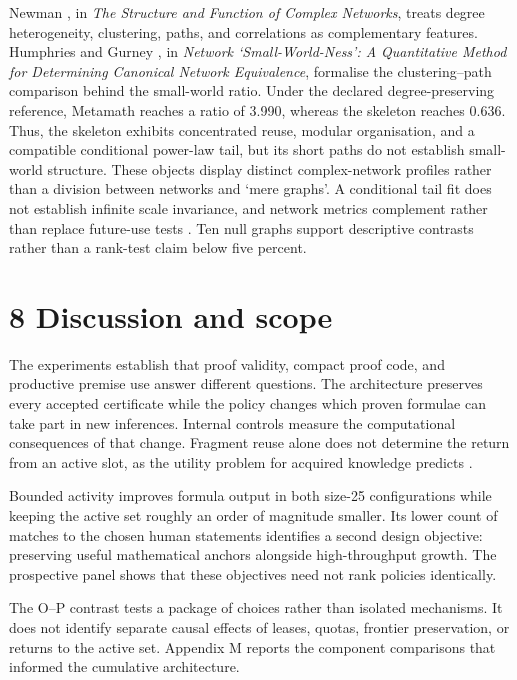 \documentclass[pdflatex,sn-basic,Numbered]{sn-jnl}
\begin{document}
Newman \citep{Newman2003}, in \emph{The Structure and Function of Complex Networks}, treats degree heterogeneity, clustering, paths, and correlations as complementary features. Humphries and Gurney \citep{HumphriesGurney2008}, in \emph{Network `Small-World-Ness': A Quantitative Method for Determining Canonical Network Equivalence}, formalise the clustering--path comparison behind the small-world ratio. Under the declared degree-preserving reference, Metamath reaches a ratio of 3.990, whereas the skeleton reaches 0.636. Thus, the skeleton exhibits concentrated reuse, modular organisation, and a compatible conditional power-law tail, but its short paths do not establish small-world structure. These objects display distinct complex-network profiles rather than a division between networks and `mere graphs'. A conditional tail fit does not establish infinite scale invariance, and network metrics complement rather than replace future-use tests \citep{ClausetEtAl2009,BroidoClauset2019}. Ten null graphs support descriptive contrasts rather than a rank-test claim below five percent.

\section*{8 Discussion and scope}\label{discussion-and-scope}

The experiments establish that proof validity, compact proof code, and productive premise use answer different questions. The architecture preserves every accepted certificate while the policy changes which proven formulae can take part in new inferences. Internal controls measure the computational consequences of that change. Fragment reuse alone does not determine the return from an active slot, as the utility problem for acquired knowledge predicts \citep{Minton1990Utility}.

Bounded activity improves formula output in both size-25 configurations while keeping the active set roughly an order of magnitude smaller. Its lower count of matches to the chosen human statements identifies a second design objective: preserving useful mathematical anchors alongside high-throughput growth. The prospective panel shows that these objectives need not rank policies identically.

The O--P contrast tests a package of choices rather than isolated mechanisms. It does not identify separate causal effects of leases, quotas, frontier preservation, or returns to the active set. Appendix M reports the component comparisons that informed the cumulative architecture.
\end{document}
